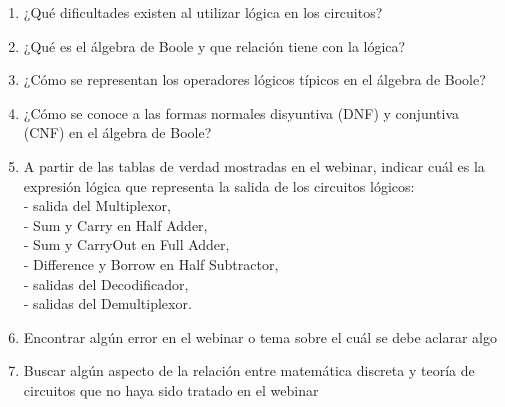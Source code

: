 \documentclass[a4paper]{article}
\newcommand{\Item}{\item[\stepcounter{enumii}$\blacktriangleright$\textbf{(\alph{enumii})}]} %
\begin{document}
\begin{enumerate}[resume]
\begin{enumerate} [label=(\alph*)]
		\item ¿Qué dificultades existen al utilizar lógica en los circuitos? 
		\Item ¿Qué es el álgebra de Boole y que relación tiene con la lógica?
		\Item ¿Cómo se representan los operadores lógicos típicos en el álgebra de Boole? 
		\item ¿Cómo se conoce a las formas normales disyuntiva (DNF) y conjuntiva (CNF) en el álgebra de Boole? 
		\item A partir de las tablas de verdad mostradas en el webinar, indicar cuál es la expresión lógica que representa la salida de los circuitos lógicos: \\ - salida del Multiplexor,\\ - Sum y Carry en Half Adder,\\ - Sum y CarryOut en Full Adder,\\ - Difference y Borrow en Half Subtractor,\\ - salidas del Decodificador,\\ - salidas del Demultiplexor. 
		\item Encontrar algún error en el webinar o tema sobre el cuál se debe aclarar algo 
		\item Buscar algún aspecto de la relación entre matemática discreta y teoría de circuitos que no haya sido tratado en el webinar
	\end{enumerate}
	\fi
\end{enumerate}
\vspace{20pt} 
\end{document}
